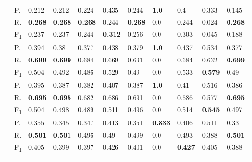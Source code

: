 \begin{tabularx}{\textwidth}{p{1.3em}l Z  Z  Z  Z  Z  Z  Z  Z  Z }
    & P.    & 0.212    & 0.212    & 0.224    & 0.435    & 0.244    & \textbf{ 1.0 }    & 0.4    & 0.333    & 0.145 \\
    & R.    & \textbf{ 0.268 }    & \textbf{ 0.268 }    & \textbf{ 0.268 }    & 0.244    & \textbf{ 0.268 }    & 0.0    & 0.244    & 0.024    & \textbf{ 0.268 } \\
    & F\textsubscript{1}    & 0.237    & 0.237    & 0.244    & \textbf{ 0.312 }    & 0.256    & 0.0    & 0.303    & 0.045    & 0.188 \\
     \midrule {}

    & P.    & 0.394    & 0.38    & 0.377    & 0.438    & 0.379    & \textbf{ 1.0 }    & 0.437    & 0.534    & 0.377 \\
    & R.    & \textbf{ 0.699 }    & \textbf{ 0.699 }    & 0.684    & 0.669    & 0.691    & 0.0    & 0.684    & 0.632    & \textbf{ 0.699 } \\
    & F\textsubscript{1}    & 0.504    & 0.492    & 0.486    & 0.529    & 0.49    & 0.0    & 0.533    & \textbf{ 0.579 }    & 0.49 \\
     \midrule {}

    & P.    & 0.395    & 0.387    & 0.382    & 0.407    & 0.387    & \textbf{ 1.0 }    & 0.41    & 0.516    & 0.386 \\
    & R.    & \textbf{ 0.695 }    & \textbf{ 0.695 }    & 0.682    & 0.686    & 0.691    & 0.0    & 0.686    & 0.577    & \textbf{ 0.695 } \\
    & F\textsubscript{1}    & 0.504    & 0.498    & 0.489    & 0.511    & 0.496    & 0.0    & 0.514    & \textbf{ 0.545 }    & 0.497 \\
     \midrule {}

    & P.    & 0.355    & 0.345    & 0.347    & 0.413    & 0.351    & \textbf{ 0.833 }    & 0.406    & 0.511    & 0.33 \\
    & R.    & \textbf{ 0.501 }    & \textbf{ 0.501 }    & 0.496    & 0.49    & 0.499    & 0.0    & 0.493    & 0.388    & \textbf{ 0.501 } \\
    & F\textsubscript{1}    & 0.405    & 0.399    & 0.397    & 0.426    & 0.401    & 0.0    & \textbf{ 0.427 }    & 0.405    & 0.388 \\
     \midrule {}

\end{tabularx}